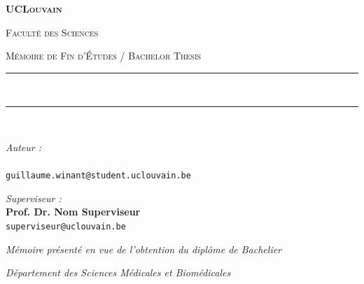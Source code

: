 \begin{titlepage}
  \begin{singlespace}
  \centering
  \vspace*{0.04\textheight}

  {\scshape\LARGE \textbf{UCLouvain}\par}
  \vspace{0.4cm}
  {\textsc{\Large Faculté des Sciences}\par}
  \vspace{1.5cm}

  {\textsc{\Large Mémoire de Fin d'Études / Bachelor Thesis}\par}
  \vspace{0.8cm}

  \rule{0.9\linewidth}{0.8pt} \\[0.4cm]
  {\huge\bfseries \thetitle \par} \vspace{0.3cm}
  \rule{0.9\linewidth}{0.8pt} \\[1.5cm]

  \begin{minipage}[t]{0.48\textwidth}
    \begin{flushleft}\large
      \emph{Auteur :}\\
      \textbf{\theauthor}\\
      \footnotesize\texttt{guillaume.winant@student.uclouvain.be}
    \end{flushleft}
  \end{minipage}
  \hfill
  \begin{minipage}[t]{0.48\textwidth}
    \begin{flushright}\large
      \emph{Superviseur :}\\
      \textbf{Prof. Dr. Nom Superviseur}\\
      \footnotesize\texttt{superviseur@uclouvain.be}
    \end{flushright}
  \end{minipage}

  \vfill

  {\large \textit{Mémoire présenté en vue de l'obtention du diplôme de Bachelier}\par}
  \vspace{0.3cm}
  {\textit{Département des Sciences Médicales et Biomédicales}\par}

  \vfill
  \vfill

  {\large \thedate\par}
  \end{singlespace}
\end{titlepage}
